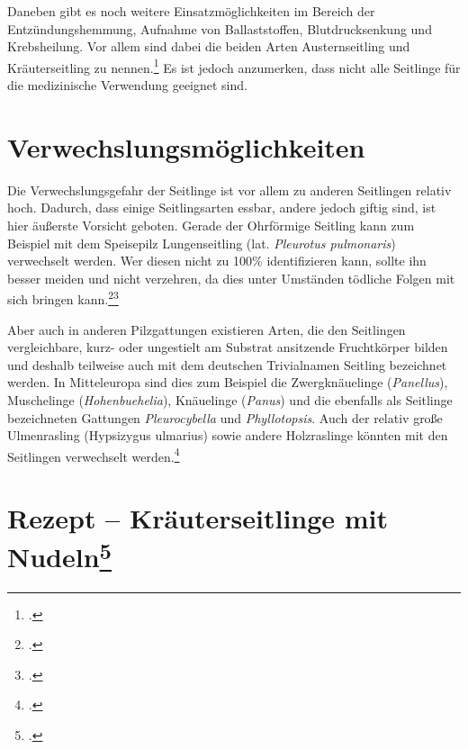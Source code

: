 \documentclass[a4paper,abstracton]{scrreprt}
\begin{document}
Daneben gibt es noch weitere Einsatzmöglichkeiten im Bereich der Entzündungshemmung, Aufnahme von Ballaststoffen, Blutdrucksenkung und Krebsheilung.
Vor allem sind dabei die beiden Arten Austernseitling und Kräuterseitling zu nennen.\footcite{vital} Es ist jedoch anzumerken, dass nicht alle Seitlinge für die medizinische Verwendung geeignet sind.

\section{Verwechslungsmöglichkeiten}
Die Verwechslungsgefahr der Seitlinge ist vor allem zu anderen Seitlingen relativ hoch. Dadurch, dass einige Seitlingsarten essbar, andere jedoch giftig sind, ist hier äußerste Vorsicht geboten. Gerade der Ohrförmige Seitling kann zum Beispiel mit dem Speisepilz Lungenseitling (lat. \emph{Pleurotus pulmonaris}) verwechselt werden. Wer diesen nicht zu 100\% identifizieren kann, sollte ihn besser meiden und nicht verzehren, da dies unter Umständen tödliche Folgen mit sich bringen kann.\footcite{pg_ohrfoermig}\footcite{deutschlandradio}

Aber auch in anderen Pilzgattungen existieren Arten, die den Seitlingen vergleichbare, kurz- oder ungestielt am Substrat ansitzende Fruchtkörper bilden und deshalb teilweise auch mit dem deutschen Trivialnamen Seitling bezeichnet werden. In Mitteleuropa sind dies zum Beispiel die Zwergknäuelinge (\emph{Panellus}), Muschelinge (\emph{Hohenbuehelia}), Knäuelinge (\emph{Panus}) und die ebenfalls als Seitlinge bezeichneten Gattungen \emph{Pleurocybella} und \emph{Phyllotopsis}. Auch der relativ große Ulmenrasling (Hypsizygus ulmarius) sowie andere Holzraslinge könnten mit den Seitlingen verwechselt werden.\footcite{faktenuber}

\section[Rezept -- Kräuterseitlinge mit Nudeln]{Rezept -- Kräuterseitlinge mit Nudeln\footcite{rezept}}
\end{document}
